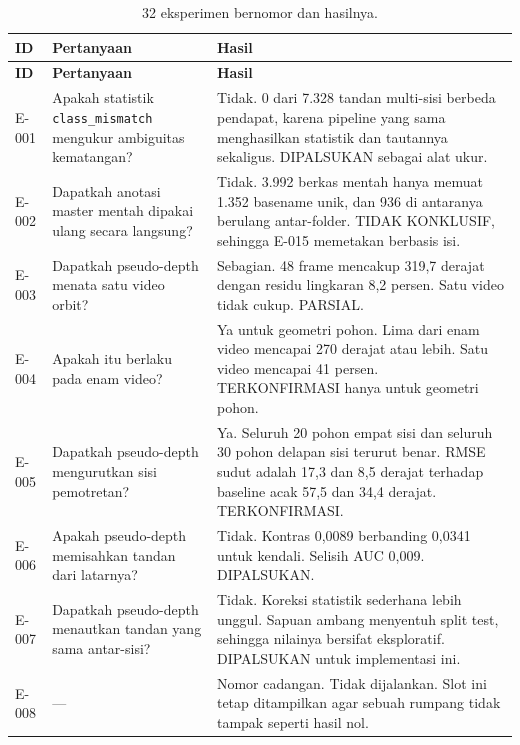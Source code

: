 \documentclass[preprint,12pt]{elsarticle}
\newcommand{\E}[1]{E-#1}
\begin{document}
\begin{longtable}{L{0.07\textwidth}L{0.28\textwidth}L{0.55\textwidth}}
\caption{32 eksperimen bernomor dan hasilnya.}
\label{tab:allexp}\\
\toprule
\textbf{ID} & \textbf{Pertanyaan} & \textbf{Hasil}\\
\midrule
\endfirsthead
\toprule
\textbf{ID} & \textbf{Pertanyaan} & \textbf{Hasil}\\
\midrule
\endhead
\bottomrule
\endfoot

\E{001} & Apakah statistik \texttt{class\_mismatch} mengukur ambiguitas
kematangan? & Tidak. 0 dari 7.328 tandan multi-sisi berbeda pendapat, karena
pipeline yang sama menghasilkan statistik dan tautannya sekaligus. DIPALSUKAN
sebagai alat ukur.\\

\E{002} & Dapatkah anotasi master mentah dipakai ulang secara langsung? & Tidak.
3.992 berkas mentah hanya memuat 1.352 basename unik, dan 936 di antaranya
berulang antar-folder. TIDAK KONKLUSIF, sehingga \E{015} memetakan berbasis
isi.\\

\E{003} & Dapatkah pseudo-depth menata satu video orbit? & Sebagian. 48 frame
mencakup 319,7 derajat dengan residu lingkaran 8,2 persen. Satu video tidak
cukup. PARSIAL.\\

\E{004} & Apakah itu berlaku pada enam video? & Ya untuk geometri pohon. Lima
dari enam video mencapai 270 derajat atau lebih. Satu video mencapai 41 persen.
TERKONFIRMASI hanya untuk geometri pohon.\\

\E{005} & Dapatkah pseudo-depth mengurutkan sisi pemotretan? & Ya. Seluruh 20
pohon empat sisi dan seluruh 30 pohon delapan sisi terurut benar. RMSE sudut
adalah 17,3 dan 8,5 derajat terhadap baseline acak 57,5 dan 34,4 derajat.
TERKONFIRMASI.\\

\E{006} & Apakah pseudo-depth memisahkan tandan dari latarnya? & Tidak. Kontras
0,0089 berbanding 0,0341 untuk kendali. Selisih AUC 0,009. DIPALSUKAN.\\

\E{007} & Dapatkah pseudo-depth menautkan tandan yang sama antar-sisi? & Tidak.
Koreksi statistik sederhana lebih unggul. Sapuan ambang menyentuh split test,
sehingga nilainya bersifat eksploratif. DIPALSUKAN untuk implementasi ini.\\

\E{008} & --- & Nomor cadangan. Tidak dijalankan. Slot ini tetap ditampilkan
agar sebuah rumpang tidak tampak seperti hasil nol.\\


\end{longtable}
\end{document}
